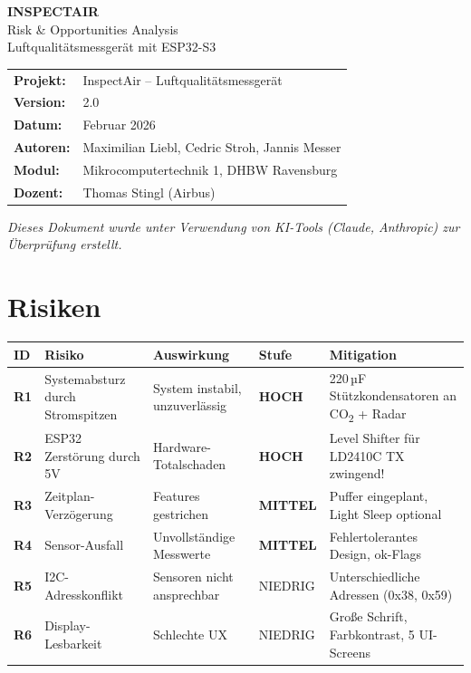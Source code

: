 \documentclass[a4paper,11pt]{article}
\begin{document}
\begin{center}
{\LARGE\textbf{INSPECTAIR}}\\[0.3cm]
{\Large Risk \& Opportunities Analysis}\\[0.3cm]
{\large Luftqualitätsmessgerät mit ESP32-S3}\\[0.5cm]
\begin{tabular}{ll}
\textbf{Projekt:} & InspectAir -- Luftqualitätsmessgerät \\
\textbf{Version:} & 2.0 \\
\textbf{Datum:} & Februar 2026 \\
\textbf{Autoren:} & Maximilian Liebl, Cedric Stroh, Jannis Messer \\
\textbf{Modul:} & Mikrocomputertechnik 1, DHBW Ravensburg \\
\textbf{Dozent:} & Thomas Stingl (Airbus) \\
\end{tabular}
\end{center}

\vspace{0.5cm}
\noindent\textit{Dieses Dokument wurde unter Verwendung von KI-Tools (Claude, Anthropic) zur Überprüfung erstellt.}
\vspace{0.3cm}

\tableofcontents
\newpage

\section{Risiken}

\begin{longtable}{p{0.8cm} p{3cm} p{3cm} p{2cm} p{4cm}}
\toprule
\rowcolor{tableheader}
\textbf{ID} & \textbf{Risiko} & \textbf{Auswirkung} & \textbf{Stufe} & \textbf{Mitigation} \\
\midrule
\endhead
\textbf{R1} & Systemabsturz durch Stromspitzen & System instabil, unzuverlässig & \textcolor{riskhigh}{\textbf{HOCH}} & 220\,µF Stützkondensatoren an CO\textsubscript{2} + Radar \\
\midrule
\textbf{R2} & ESP32 Zerstörung durch 5V & Hardware-Totalschaden & \textcolor{riskhigh}{\textbf{HOCH}} & Level Shifter für LD2410C TX zwingend! \\
\midrule
\textbf{R3} & Zeitplan-Verzögerung & Features gestrichen & \textcolor{riskmedium}{\textbf{MITTEL}} & Puffer eingeplant, Light Sleep optional \\
\midrule
\textbf{R4} & Sensor-Ausfall & Unvollständige Messwerte & \textcolor{riskmedium}{\textbf{MITTEL}} & Fehlertolerantes Design, ok-Flags \\
\midrule
\textbf{R5} & I2C-Adresskonflikt & Sensoren nicht ansprechbar & \textcolor{risklow}{NIEDRIG} & Unterschiedliche Adressen (0x38, 0x59) \\
\midrule
\textbf{R6} & Display-Lesbarkeit & Schlechte UX & \textcolor{risklow}{NIEDRIG} & Große Schrift, Farbkontrast, 5 UI-Screens \\
\bottomrule
\end{longtable}
\end{document}

